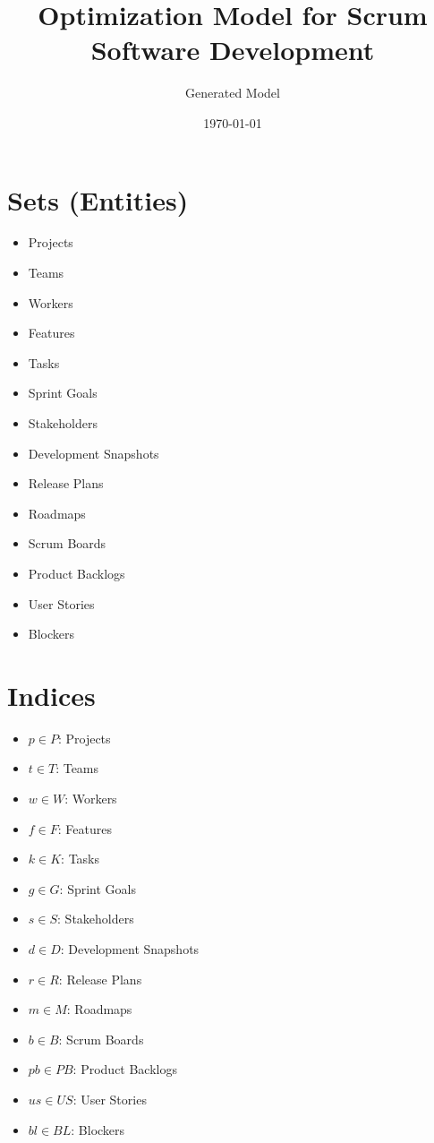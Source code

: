 \documentclass{article}
\title{Optimization Model for Scrum Software Development}
\author{Generated Model}
\date{\today}
\begin{document}
\maketitle
\tableofcontents

\section{Sets (Entities)}
\begin{itemize}
    \item Projects
    \item Teams
    \item Workers
    \item Features
    \item Tasks
    \item Sprint Goals
    \item Stakeholders
    \item Development Snapshots
    \item Release Plans
    \item Roadmaps
    \item Scrum Boards
    \item Product Backlogs
    \item User Stories
    \item Blockers
\end{itemize}

\section{Indices}
\begin{itemize}
    \item $p \in P$: Projects
    \item $t \in T$: Teams
    \item $w \in W$: Workers
    \item $f \in F$: Features
    \item $k \in K$: Tasks
    \item $g \in G$: Sprint Goals
    \item $s \in S$: Stakeholders
    \item $d \in D$: Development Snapshots
    \item $r \in R$: Release Plans
    \item $m \in M$: Roadmaps
    \item $b \in B$: Scrum Boards
    \item $pb \in PB$: Product Backlogs
    \item $us \in US$: User Stories
    \item $bl \in BL$: Blockers
\end{itemize}
\end{document}
